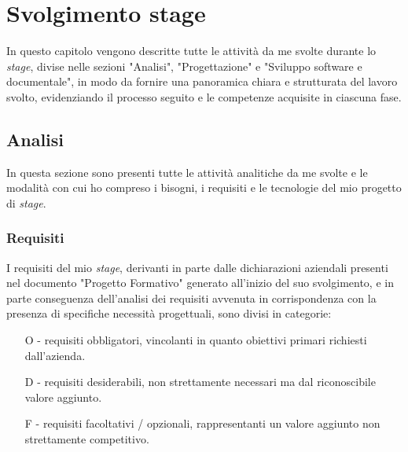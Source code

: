 \chapter{Svolgimento stage}
\label{cap:svolgimentoStage}
In questo capitolo vengono descritte tutte le attività da me svolte durante lo \emph{stage}, divise nelle sezioni "Analisi", "Progettazione" e "Sviluppo software e documentale", in modo da fornire una panoramica chiara e strutturata del lavoro svolto, evidenziando il processo seguito e le competenze acquisite in ciascuna fase.\\
\section{Analisi}
In questa sezione sono presenti tutte le attività analitiche da me svolte e le modalità con cui ho compreso i bisogni, i requisiti e le tecnologie del mio progetto di \emph{stage}.\\

\subsection{Requisiti}
I requisiti del mio \emph{stage}, derivanti in parte dalle dichiarazioni aziendali presenti nel documento "Progetto Formativo" generato all'inizio del suo svolgimento, e in parte conseguenza dell'analisi dei requisiti avvenuta in corrispondenza con la presenza di specifiche necessità progettuali, sono divisi in categorie:
\begin{enumerate}
	\item[O -]requisiti obbligatori, vincolanti in quanto obiettivi primari richiesti dall'azienda.
    \item[D -]requisiti desiderabili, non strettamente necessari ma dal riconoscibile valore aggiunto.
    \item[F -]requisiti facoltativi / opzionali, rappresentanti un valore aggiunto non strettamente competitivo.
\end{enumerate}

